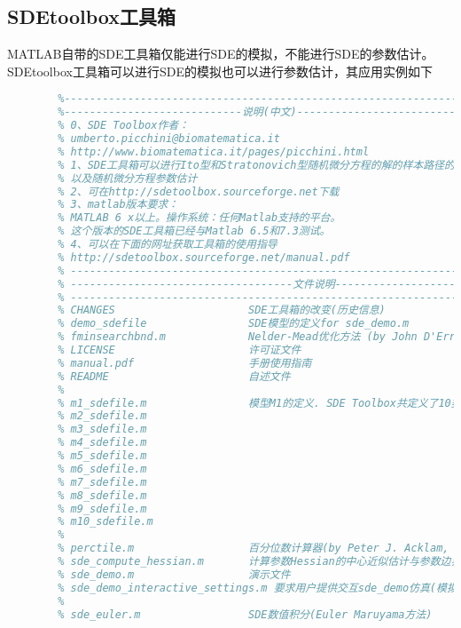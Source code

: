     \subsection{SDEtoolbox工具箱}
        \par
        MATLAB自带的SDE工具箱仅能进行SDE的模拟，不能进行SDE的参数估计。SDEtoolbox工具箱可以进行SDE的模拟也可以进行参数估计，其应用实例如下
        \begin{lstlisting}[language= Matlab]
        %% 文件展示了SDE Toolbox(by Umberto Picchini)的使用
        %---------------------------------------------------------------%
        %----------------------------说明(中文)-------------------------%
        % 0、SDE Toolbox作者：
        % umberto.picchini@biomatematica.it
        % http://www.biomatematica.it/pages/picchini.html
        % 1、SDE工具箱可以进行Ito型和Stratonovich型随机微分方程的解的样本路径的模拟，
        % 以及随机微分方程参数估计
        % 2、可在http://sdetoolbox.sourceforge.net下载
        % 3、matlab版本要求：
        % MATLAB 6 x以上。操作系统：任何Matlab支持的平台。
        % 这个版本的SDE工具箱已经与Matlab 6.5和7.3测试。
        % 4、可以在下面的网址获取工具箱的使用指导
        % http://sdetoolbox.sourceforge.net/manual.pdf
        % --------------------------------------------------------------%
        % -----------------------------------文件说明-------------------%
        % --------------------------------------------------------------%
        % CHANGES                     SDE工具箱的改变(历史信息)
        % demo_sdefile                SDE模型的定义for sde_demo.m
        % fminsearchbnd.m             Nelder-Mead优化方法 (by John D'Errico, woodchips@rochester.rr.com)
        % LICENSE                     许可证文件
        % manual.pdf                  手册使用指南
        % README                      自述文件
        %
        % m1_sdefile.m                模型M1的定义. SDE Toolbox共定义了10类SDE问题(当然你可以定义自己的问题)
        % m2_sdefile.m
        % m3_sdefile.m
        % m4_sdefile.m
        % m5_sdefile.m
        % m6_sdefile.m
        % m7_sdefile.m
        % m8_sdefile.m
        % m9_sdefile.m
        % m10_sdefile.m
        %
        % perctile.m                  百分位数计算器(by Peter J. Acklam, pjacklam@online.no)
        % sde_compute_hessian.m       计算参数Hessian的中心近似估计与参数边界检查(originally written by Andrea De Gaetano, www.biomatematica.it)
        % sde_demo.m                  演示文件
        % sde_demo_interactive_settings.m 要求用户提供交互sde_demo仿真(模拟)设置
        %
        % sde_euler.m                 SDE数值积分(Euler Maruyama方法)

\end{lstlisting}
